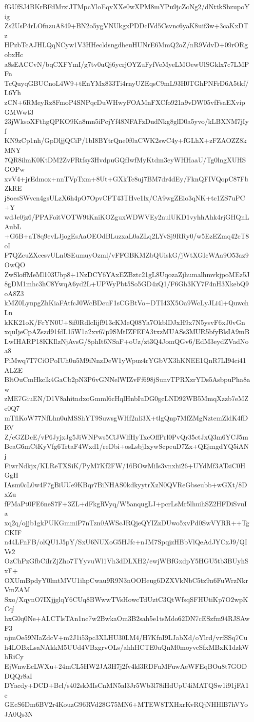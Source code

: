 fGUfSJ4BKrBFdMrziJTMpcYloEqvXXe0wXPM8mYPu9jcZoNg2/dNttkSbzupoYig
Zs2UsP4rLOfnzuA849+BN2o5ygVNUkgxPDDclVd5Csvnc6yaK8uif3w+3caKxDTz
HPzbTcAJHLQqNCyw1V3HHecldsngdheuHUNrE6MmQ2oZ/nR9VdvD+09rORgobxHc
a8sEACCvN/bqCXFYmI/g7tv0uQj6ycrjOYZuFyfVeMyeLMOewUlSGklx7c7LMPFn
TcQuyqGBUCnoL4W9+tEnYMx833Ti4rnyUZEqsC9mL93H0TGhPNFrD6A5tkf/L6Yh
zCN+6RMeyRz8FmoP4SNPqcDuWHwyFOAMnFXCfo921a9vDW05vfFsaEXvipGMWwt3
23jWksoXFthgQPKO9Ka8mn5iPcjYf48NFAFzDudNkg8glD0a5yvo/kLBXNM7jIyf
KN9zCp1nh/GpDljjQCiP/1bI8BYtrQne0f0aCWK2swC4y+fGLhX+zFZAOZZ8kMNY
7QR8ilmK0KtDM2ZvFRtfsy3HvdpuGQfIwfMyKtdm3eyWHHaaU/Tg0lngXUHSGOPw
xvV4+jrEdmox+nnTVpTxm+8Ut+GXkTe8uj7BM7dr4dEy/FknQFIVQopC87FbZkRE
j8oesSWvcn4gsULzX6h4pO7OpvCFT43THve1lx/CA9wgZEio3qNK+tc1ZS7uPC+Y
wdJc0jz6/PPAFoitVOTW9tKniKOZguxWDWVEy2nulUKD1vyhhAhk4rjGHQnLAubL
+G6B+aT8q9evLJjogEsAaOEOdBLuzxaL0aZLq2LYvSj9RRy0/w5EzEZmq42cT8oI
P7QZcuZXcesvULn0SEumuyOzml/vFFGBKMZbQUiskG/jWtXGIcWAa9O53az9OwQO
ZwSloffMeMl103Ubp8+1NzDCY6YAxEZBztc21gL8UqozaZjhumalhmvkjpoMEz5J
8gDM1mhc3hC8YwqA6yd2L+UPWyPbt5So5GD4zQ1/F6Gh3KY7F4nH3XkebQ9oA8Z3
kMZ0LynpgZhKiaFAtfcJ0WcBDcuF1sCGBtVo+DTI43X5Oa9WcLyJLi4l+QuwchLn
kKK21oK/FcYN0U+8if0RdlcIijf913cKMeQ08Ya7OkblDJxH9x7N5ysvF6xJ0vGn
xquIjeCpAZszd91fdL15W1a2xv67p9SMtIZFEFA3txzMUASs3MUR5bfyBlsIA9mB
LwIHARP18KKIlzNjAvsG/8phIt6NSaF+oUz/zt3Q4JomQGv6/EdM3eydZVadNoa8
PiMwq7T7CiOPoIUh0u5M9iNnzDeW1yWpuz4rYGbVX3hKNEE1QnR7LI94ci41ALZE
BltOuCmHkclk4GaCb2pN3P6vGNNelWIZvFf698jSunvTPRXzrYDs5AsbpuPha8aw
zME7GiuEN/D1V8ahitndxoGmml6cHqlHnbIuDG0gcLND92WB5MmqXzzb7eMZe0Q7
mTfiKoW77NfLhn0uMSShYT9SuwsgWHf2nli3X+tlgQnp7MfZMgNztemZldK4fDRV
Z/eGZDcE/vP6JyjxJg5JiWNPws5CiJWlfHyTxcOffPrl0PvQr35ctJxQ3m6YCJ5m
BeaG6mCtKyVfg6TrtaF4Wxd1/reDbi+osLsbjIxywScpeuD7Zx+QEjmgdYQ5iANj
FiwrNdkjx/KLReTXSiK/PyM7Kf2FW/16BOwMiIs3vnxhi26+UYdMf3ATsiC0HGgH
IAsm0cL0w4F7gBiUUe9KBqr7BiNHAS0kdkyytrXzN0QVReGbseubb+wGXt/8DxZu
fFMaPt0FE6neS7F+3ZL+dFkgRVyq/W5anqugLJ+pcrLsMr5lhuihSZ2HFDiSvuIa
xq2q/ojjb1gkPUKGmmiP7nTzn0AWScJRQjeQYIZzDUwo5xvPd0SwVYRR++TgCKIF
n44LFnFB/olQU1J5pY/SxU6NUXoG5HJfc+nJM7SpqjzHBbVlQeAdJYCxJ9/QIVs2
OzChPzGfbCiIrZjZho7TYyvuWl1Vh3dDLXH2/ewjWBfGxdpY5HGU5tb3BUyhSxF+
OXUmBpdyY0lmtMVU1ihpCwau9R9N3nOOHeug6DZXVkNbC5tz9n6FuWrzNkrVmZAM
Sxo/XqynO7IXjjglqY6CUq8BWwwTVsHowcTdUztC3QtWfsqSFHUtiKp7O2wpKCql
hxG0q0Ne+ALCTlsTAn1nc7w2BwkaOm3B2sah5e1tsMdo62DN7cESzfm94RJSAwF3
njmOe59NIaZdcV+m2J1i53pc3XLHU30LM4/H7KfnI9LJabXd/oYlrd/vrfSSq7Cu
h4LOBxLsaNAkkM5UUd4VBxgrvOLs/ahhHCTE0uQnM0moyvcSfxMBxK1dzkWhRiCy
EjWnwEcLWXu+24mCL5HW2JA3H7j2fv4kl3RDFuMFuwAeWFEqBOu8t7GODDQQr8aI
DYacdy+DCD+Bcl/s402skMIsCnMN5al3Jr5Wb3l78iHdUpU4iMATQSw1i91jFA1c
GEcS6Dm6BV2r4KouzG96RVd28G75MN6+MTEW8TXHxrKvRQjNHHlB7hVYoJA0Qs3N
